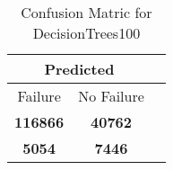 \begin{table}[] 
\caption{Confusion Matric for DecisionTrees100} 
\label{Table: Prediction Accuracy-NoneDecisionTrees100DecisionTrees100EKF-ignoreReflection100.9EKF-top2-Reflection} 
\centering 
\begin{tabular} 
 {@{}ccc@{}} 
\toprule 
\multicolumn{2}{c}{\textbf{Predicted}}
 \\ \midrule 
\multicolumn{1}{|c|}{Failure} & 
\multicolumn{1}{c|}{No Failure}
 \\ \midrule 
\multicolumn{1}{|c|}{\color{green}\textbf{116866}} & 
\multicolumn{1}{c|}{\color{green}\textbf{40762}}
 \\ \midrule 
\multicolumn{1}{|c|}{\color{red}\textbf{5054}} & 
\multicolumn{1}{c|}{\color{red}\textbf{7446}}
 \\ \bottomrule 
\end{tabular} 
\end{table} 
